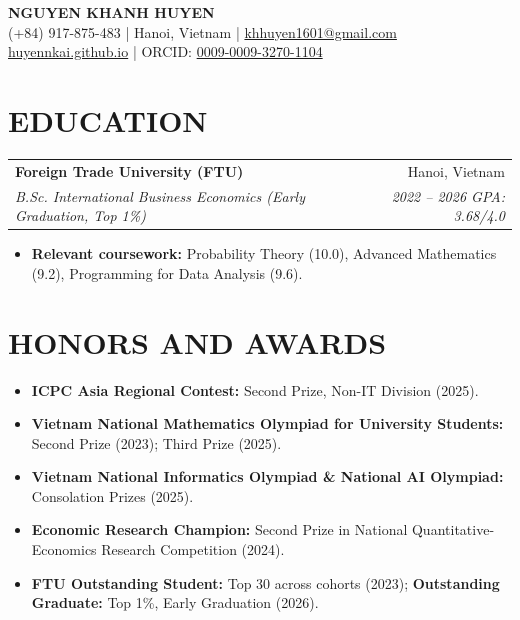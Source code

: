 \documentclass[letterpaper,10pt]{article}
\makeatletter
\newcommand{\cvHeading}[4]{%
  \begin{tabular*}{\textwidth}
    {l@{\extracolsep{\fill}}r}
    \textbf{#1} & \color{subtle}#2 \\
    \textit{#3} & \textit{\color{subtle}#4} \\
  \end{tabular*}%
  \par\vspace{0pt}%
}
\makeatother
\begin{document}
\begin{center}
  {\LARGE\bfseries\color{accent}
  NGUYEN KHANH HUYEN}\\[4pt]
  (+84) 917-875-483 \quad | \quad
  Hanoi, Vietnam \quad | \quad
  \href{mailto:khhuyen1601@gmail.com}
  {khhuyen1601@gmail.com}\\[2pt]
  \href{https://huyennkai.github.io/}
  {huyennkai.github.io}
  \quad | \quad
  ORCID:
  \href{https://orcid.org/0009-0009-3270-1104}
  {0009-0009-3270-1104}
\end{center}

\section{EDUCATION}

\cvHeading
{Foreign Trade University (FTU)}
{Hanoi, Vietnam}
{B.Sc. International Business Economics
(Early Graduation, Top 1\%)}
{2022 -- 2026 \quad GPA: 3.68/4.0}

\begin{itemize}
  \item \textbf{Relevant coursework:}
  Probability Theory (10.0),
  Advanced Mathematics (9.2),
  Programming for Data Analysis (9.6).
\end{itemize}
\section{HONORS AND AWARDS}

\begin{itemize}

  \item \textbf{ICPC Asia Regional Contest:}
  Second Prize, Non-IT Division (2025).

  \item \textbf{Vietnam National Mathematics
  Olympiad for University Students:}
  Second Prize (2023); Third Prize (2025).

  \item \textbf{Vietnam National Informatics
  Olympiad \& National AI Olympiad:}
  Consolation Prizes (2025).

  \item \textbf{Economic Research Champion:}
  Second Prize in National
  Quantitative-Economics Research
  Competition (2024).

  \item \textbf{FTU Outstanding Student:}
  Top 30 across cohorts (2023);
  \textbf{Outstanding Graduate:}
  Top 1\%, Early Graduation (2026).

\end{itemize}
\end{document}
